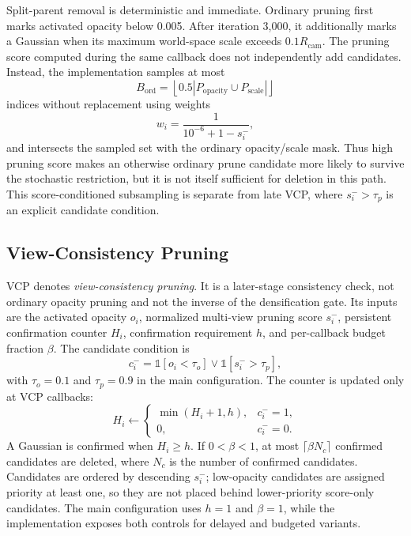 Split-parent removal is deterministic and immediate. Ordinary pruning first marks activated opacity below 0.005. After iteration 3,000, it additionally marks a Gaussian when its maximum world-space scale exceeds $0.1R_{\mathrm{cam}}$. The pruning score computed during the same callback does not independently add candidates. Instead, the implementation samples at most
\begin{equation}
B_{\mathrm{ord}}=\left\lfloor 0.5
\left|P_{\mathrm{opacity}}\cup P_{\mathrm{scale}}\right|
\right\rfloor
\end{equation}
indices without replacement using weights
\begin{equation}
w_i=\frac{1}{10^{-6}+1-s_i^{-}},
\end{equation}
and intersects the sampled set with the ordinary opacity/scale mask. Thus high pruning score makes an otherwise ordinary prune candidate more likely to survive the stochastic restriction, but it is not itself sufficient for deletion in this path. This score-conditioned subsampling is separate from late VCP, where $s_i^{-}>\tau_p$ is an explicit candidate condition.

\subsection{View-Consistency Pruning}

VCP denotes \emph{view-consistency pruning}. It is a later-stage consistency check, not ordinary opacity pruning and not the inverse of the densification gate. Its inputs are the activated opacity $o_i$, normalized multi-view pruning score $s_i^{-}$, persistent confirmation counter $H_i$, confirmation requirement $h$, and per-callback budget fraction $\beta$. The candidate condition is
\begin{equation}
c_i^{-}
=
\mathbb{1}[o_i<\tau_o]
\lor
\mathbb{1}[s_i^{-}>\tau_p],
\end{equation}
with $\tau_o=0.1$ and $\tau_p=0.9$ in the main configuration. The counter is updated only at VCP callbacks:
\begin{equation}
H_i\leftarrow
\begin{cases}
\min(H_i+1,h), & c_i^{-}=1,\\
0, & c_i^{-}=0.
\end{cases}
\end{equation}
A Gaussian is confirmed when $H_i\ge h$. If $0<\beta<1$, at most $\lceil\beta N_c\rceil$ confirmed candidates are deleted, where $N_c$ is the number of confirmed candidates. Candidates are ordered by descending $s_i^{-}$; low-opacity candidates are assigned priority at least one, so they are not placed behind lower-priority score-only candidates. The main configuration uses $h=1$ and $\beta=1$, while the implementation exposes both controls for delayed and budgeted variants.

